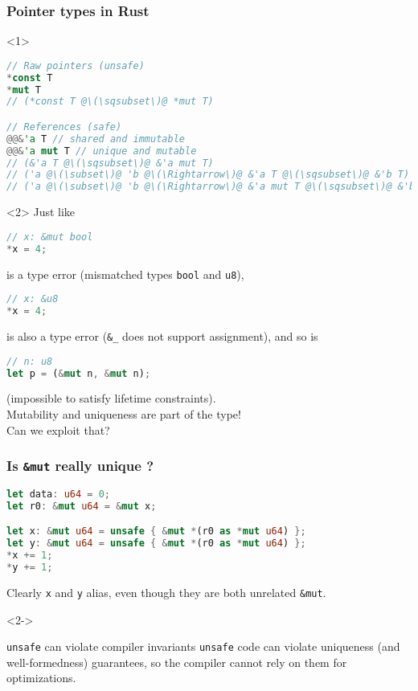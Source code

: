 \begin{frame}[fragile, t]
    \frametitle{Pointer types in Rust}
    \begin{onlyenv}<1>
        \begin{lstlisting}[language=rust, escapechar=@]
// Raw pointers (unsafe)
*const T
*mut T
// (*const T @\(\sqsubset\)@ *mut T)

// References (safe)
@@&'a T // shared and immutable
@@&'a mut T // unique and mutable
// (&'a T @\(\sqsubset\)@ &'a mut T)
// ('a @\(\subset\)@ 'b @\(\Rightarrow\)@ &'a T @\(\sqsubset\)@ &'b T)
// ('a @\(\subset\)@ 'b @\(\Rightarrow\)@ &'a mut T @\(\sqsubset\)@ &'b mut T)
        \end{lstlisting}
    \end{onlyenv}

    \begin{onlyenv}<2>
        Just like
        \begin{lstlisting}[language=rust]
// x: &mut bool
*x = 4;
        \end{lstlisting}
        is a type error (mismatched types \texttt{bool} and \texttt{u8}),
        \begin{lstlisting}[language=rust]
// x: &u8
*x = 4;
        \end{lstlisting}
        is also a type error (\texttt{\&\_} does not support assignment),
        and so is
        \begin{lstlisting}[language=rust]
// n: u8
let p = (&mut n, &mut n);
        \end{lstlisting}
        (impossible to satisfy lifetime constraints).\\

        Mutability and uniqueness are part of the type!\\
        Can we exploit that?
    \end{onlyenv}
\end{frame}

\begin{frame}[fragile, t]
    \frametitle{Is \texttt{\&mut} really unique ?}
    \begin{lstlisting}[language=rust]
let data: u64 = 0;
let r0: &mut u64 = &mut x;

let x: &mut u64 = unsafe { &mut *(r0 as *mut u64) };
let y: &mut u64 = unsafe { &mut *(r0 as *mut u64) };
*x += 1;
*y += 1;
    \end{lstlisting}
    Clearly \texttt{x} and \texttt{y} alias, even though they
    are both unrelated \texttt{\&mut}.

    \begin{onlyenv}<2->
        \begin{block}{\texttt{unsafe} can violate compiler invariants}
            \texttt{unsafe} code can violate uniqueness (and well-formedness)
            guarantees, so the compiler cannot rely on them for optimizations.
        \end{block}
    \end{onlyenv}
\end{frame}

